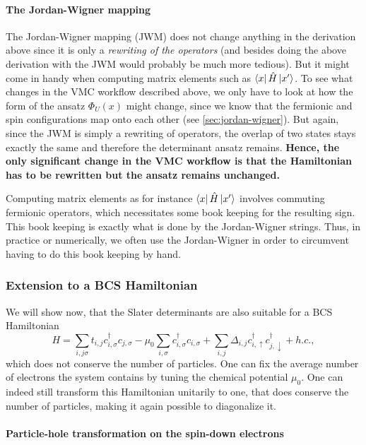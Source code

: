 \documentclass[../../../main.tex]{subfiles}
\begin{document}
\paragraph{The Jordan-Wigner mapping}
The Jordan-Wigner mapping (JWM) does not change anything in the derivation above since it is only a \emph{rewriting of the operators} (and besides doing the above derivation with the JWM would probably be much more tedious). But it might come in handy when computing matrix elements such as $\left\langle x \right\rvert \hat H \left\lvert x' \right\rangle$. To see what changes in the VMC workflow described above, we only have to look at how the form of the ansatz $\Phi_U(x)$ might change, since we know that the fermionic and spin configurations map onto each other (see \cref{sec:jordan-wigner}). But again, since the JWM is simply a rewriting of operators, the overlap of two states stays exactly the same and therefore the determinant ansatz remains. \textbf{Hence, the only significant change in the VMC workflow is that the Hamiltonian has to be rewritten but the ansatz remains unchanged.} 

Computing matrix elements as for instance $\left\langle x \right\rvert \hat H \left\lvert x' \right\rangle$ involves commuting fermionic operators, which necessitates some book keeping for the resulting sign. This book keeping is exactly what is done by the Jordan-Wigner strings. Thus, in practice or numerically, we often use the Jordan-Wigner in order to circumvent having to do this book keeping by hand.

\subsubsection{Extension to a BCS Hamiltonian}
We will show now, that the Slater determinants are also suitable for a BCS Hamiltonian
\begin{equation}
    H = \sum_{i,j\sigma} t_{i,j}c_{i,\sigma}^\dagger c_{j,\sigma} - \mu_0 \sum_{i,\sigma}c_{i,\sigma}^\dagger c_{i,\sigma} + \sum_{i,j}\Delta_{i,j} c_{i,\uparrow}^\dagger c_{j,\downarrow}^\dagger + h.c. ,
\end{equation}
which does not conserve the number of particles. One can fix the average number of electrons the system contains by tuning the chemical potential $\mu_0$. One can indeed still transform this Hamiltonian unitarily to one, that does conserve the number of particles, making it again possible to diagonalize it.

\paragraph{Particle-hole transformation on the spin-down electrons}
\end{document}
